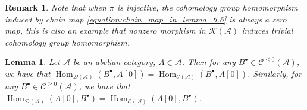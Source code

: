 \documentclass{ctexart}
\newtheorem{remark}{Remark}[section]
\newtheorem{lemma}{Lemma}[section]
\renewcommand{\hom}{\operatorname{Hom}}
\begin{document}
\begin{remark}
    Note that when $\pi$ is injective, the cohomology group homomorphism induced by chain map \ref{equation:chain_map_in_lemma_6.6} is always a zero map,
    this is also an example that nonzero morphism in $\mathcal{K}(\mathscr{A})$ induces trivial cohomology group homomorphism.
\end{remark}
\begin{lemma}
    Let $\mathscr{A}$ be an abelian category, $A\in \mathscr{A}$.
    Then for any $B^{\bullet}\in \mathcal{C}^{\le 0}(\mathscr{A})$, we have that $\hom_{\mathcal{D}(\mathscr{A})}(B^{\bullet}, A[0]) = \hom_{\mathcal{C}(\mathscr{A})}(B^{\bullet}, A[0])$.
    Similarly, for any $B^{\bullet}\in \mathcal{C}^{\ge 0}(\mathscr{A})$, we have that $\hom_{\mathcal{D}(\mathscr{A})}(A[0], B^{\bullet}) = \hom_{\mathcal{C}(\mathscr{A})}(A[0], B^{\bullet})$.
    \label{Lemma 6.7}
\end{lemma}
\end{document}
